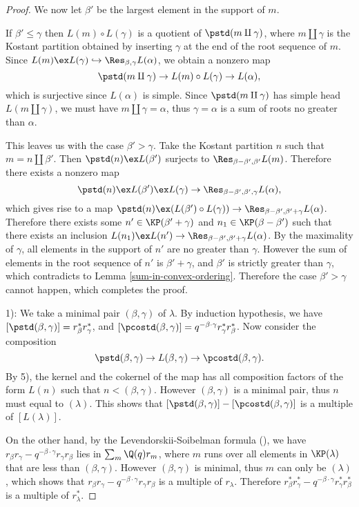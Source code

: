 \begin{proof}
    We now let $\beta'$ be the largest element in the support of $m$.

    If $\beta'\le\gamma$ then $L(m)\circ L(\gamma)$ is a quotient
    of $\pstd(m\amalg\gamma)$, where $m\amalg\gamma$ is the Kostant partition
    obtained by inserting $\gamma$ at the end of the root sequence of
    $m$. Since $L(m)\ex L(\gamma)\hookrightarrow\Res_{\beta,\gamma}L(\alpha)$,
    we obtain a nonzero map $$\pstd(m\amalg\gamma)\to L(m)\circ L(\gamma)
    \to L(\alpha),$$ which is surjective since $L(\alpha)$ is simple.
    Since $\pstd(m\amalg\gamma)$ has simple head $L(m\amalg\gamma)$,
    we must have $m\amalg\gamma = \alpha$, thus $\gamma = \alpha$
    is a sum of roots no greater than $\alpha$.

    This leaves us with the case $\beta'>\gamma$. Take the Kostant partition
    $n$ such that $m = n\amalg\beta'$. Then $\pstd(n)\ex L(\beta')$
    surjects to $\Res_{\beta-\beta',\beta'}L(m)$. Therefore there exists
    a nonzero map 
    \[
        \pstd(n)\ex L(\beta')\ex L(\gamma)\to
        \Res_{\beta-\beta',\beta',\gamma}L(\alpha),
    \] 
    which gives rise to a map
    $\pstd(n)\ex(L(\beta')\circ L(\gamma))\to\Res_{\beta-\beta',\beta'+\gamma}L(\alpha)$.
    Therefore there exists some $n'\in\KP(\beta'+\gamma)$
    and $n_1\in\KP(\beta-\beta')$ such that 
    there exists an inclusion $L(n_1)\ex L(n')\to
    \Res_{\beta-\beta',\beta'+\gamma}L(\alpha)$. By the maximality
    of $\gamma$, all elements in the support of $n'$ are no greater than
    $\gamma$. However the sum of elements in the root sequence of $n'$
    is $\beta'+\gamma$, and $\beta'$ is strictly greater than $\gamma$,
    which contradicts to Lemma \ref{sum-in-convex-ordering}.
    Therefore the case $\beta'>\gamma$ cannot happen,
    which completes the proof.

    1): We take a minimal pair $(\beta,\gamma)$ of $\lambda$.
    By induction hypothesis, we have $[\pstd(\beta,\gamma)] = r_\beta^*r_\gamma^*$,
    and $[\pcostd(\beta,\gamma)] = q^{-\beta\cdot\gamma}r_\gamma^*r_\beta^*$.
    Now consider the composition 
    \[
        \pstd(\beta,\gamma)\to L(\beta,\gamma)
        \to\pcostd(\beta,\gamma).
    \] 
    By 5), the kernel and the cokernel
    of the map has all composition factors of the form $L(n)$
    such that $n<(\beta,\gamma)$. However $(\beta,\gamma)$ is a minimal
    pair, thus $n$ must equal to $(\lambda)$. This shows that
    $[\pstd(\beta,\gamma)]-[\pcostd(\beta,\gamma)]$ is a multiple
    of $[L(\lambda)]$. 
    
    On the other hand, by the Levendorskii-Soibelman formula
    (\cite[Theorem 5.5.2]{LS}), we have $r_\beta r_\gamma
    -q^{-\beta\cdot\gamma}r_\gamma r_\beta$ lies in 
    $\sum_m\Q(q)r_m$, where $m$ runs over all elements in $\KP(\lambda)$
    that are less than $(\beta,\gamma)$. However $(\beta,\gamma)$
    is minimal, thus $m$ can only be $(\lambda)$, 
    which shows that $r_\beta r_\gamma
    -q^{-\beta\cdot\gamma}r_\gamma r_\beta$ is a multiple of $r_\lambda$.
    Therefore $r_\beta^* r_\gamma^*
    -q^{-\beta\cdot\gamma}r_\gamma^* r_\beta^*$ is a multiple of $r_\lambda^*$.


\end{proof}
